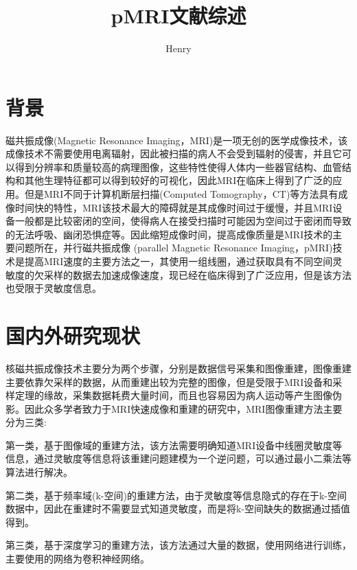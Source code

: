 \documentclass[lang=cn,11pt,a4paper,cite=numbers]{elegantpaper}
\title{pMRI文献综述}
\author{Henry}
\date{\zhtoday}
\begin{document}
\maketitle
\section{背景}
\par 磁共振成像(Magnetic Resonance Imaging，MRI)是一项无创的医学成像技术，该成像技术不需要使用电离辐射，因此被扫描的病人不会受到辐射的侵害，并且它可以得到分辨率和质量较高的病理图像，这些特性使得人体内一些器官结构、血管结构和其他生理特征都可以得到较好的可视化，因此MRI在临床上得到了广泛的应用。但是MRI不同于计算机断层扫描(Computed Tomography，CT)等方法具有成像时间快的特性，MRI该技术最大的障碍就是其成像时间过于缓慢，并且MRI设备一般都是比较密闭的空间，使得病人在接受扫描时可能因为空间过于密闭而导致的无法呼吸、幽闭恐惧症等。因此缩短成像时间，提高成像质量是MRI技术的主要问题所在，并行磁共振成像 \cite{deshmane2012parallel}(parallel Magnetic Resonance Imaging，pMRI)技术是提高MRI速度的主要方法之一，其使用一组线圈，通过获取具有不同空间灵敏度的欠采样的数据去加速成像速度，现已经在临床得到了广泛应用，但是该方法也受限于灵敏度信息。

\section{国内外研究现状}
\par 核磁共振成像技术主要分为两个步骤，分别是数据信号采集和图像重建，图像重建主要依靠欠采样的数据，从而重建出较为完整的图像，但是受限于MRI设备和采样定理的缘故，采集数据耗费大量时间，而且也容易因为病人运动等产生图像伪影。因此众多学者致力于MRI快速成像和重建的研究中，MRI图像重建方法主要分为三类:
\par 第一类，基于图像域的重建方法，该方法需要明确知道MRI设备中线圈灵敏度等信息，通过灵敏度等信息将该重建问题建模为一个逆问题，可以通过最小二乘法等算法进行解决。
\par 第二类，基于频率域(k-空间)的重建方法，由于灵敏度等信息隐式的存在于k-空间数据中，因此在重建时不需要显式知道灵敏度，而是将k-空间缺失的数据通过插值得到。
\par 第三类，基于深度学习的重建方法，该方法通过大量的数据，使用网络进行训练，主要使用的网络为卷积神经网络。
\end{document}

